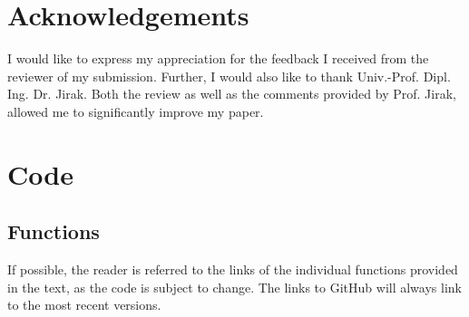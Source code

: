 \documentclass[aodsor,preprint]{imsart}
\numberwithin{equation}{section}
\theoremstyle{plain}
\begin{document}
\section*{Acknowledgements}
I would like to express my appreciation for the feedback I received from the reviewer of my submission. Further, I would also like to thank Univ.-Prof. Dipl. Ing. Dr. Jirak. Both the review as well as the comments provided by Prof. Jirak, allowed me to significantly improve my paper.

\newpage

\appendix

\section{Code}
\label{sec:app}


\subsection{Functions}
If possible, the reader is referred to the links of the individual functions provided in the text, as the code is subject to change. The links to GitHub will always link to the most recent versions.
\end{document}
